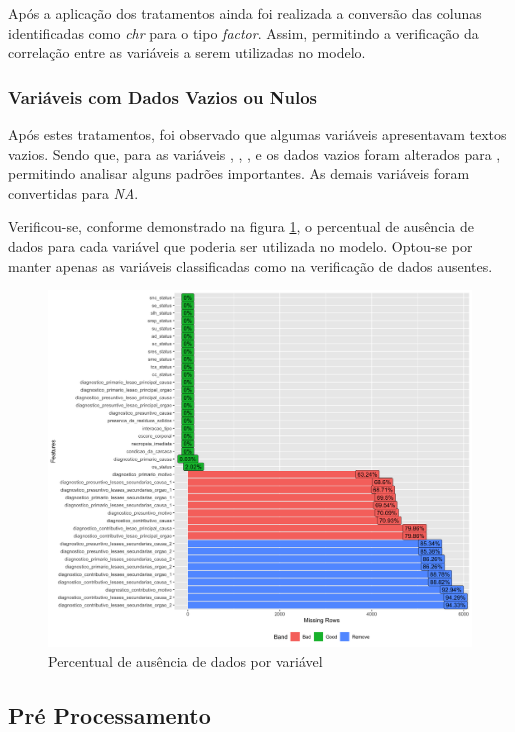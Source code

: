 \documentclass[12pt]{article}
\begin{document}
Após a aplicação dos tratamentos ainda foi realizada a conversão das colunas identificadas como \textit{chr} para o tipo \textit{factor}. Assim, permitindo a verificação da correlação entre as variáveis a serem utilizadas no modelo.

\subsubsection{Variáveis com Dados Vazios ou Nulos}

Após estes tratamentos, foi observado que algumas variáveis apresentavam textos vazios. Sendo que, para as variáveis , , ,  e  os dados vazios foram alterados para , permitindo analisar alguns padrões importantes.  As demais variáveis foram convertidas para \textit{NA}.

Verificou-se, conforme demonstrado na figura \ref{fig:pre_missing_data}, o percentual de ausência de dados para cada variável que poderia ser utilizada no modelo. Optou-se por manter apenas as variáveis classificadas como  na verificação de dados ausentes.

\begin{figure}[ht]
\centering
\includegraphics[width=.8\textwidth]{dados_faltantes_pre_limpeza.png}
\caption{Percentual de ausência de dados por variável}
\label{fig:pre_missing_data}
\end{figure}

\subsection{Pré Processamento}
\end{document}
